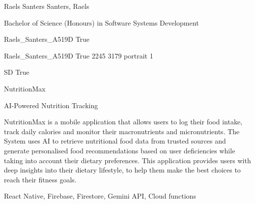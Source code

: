 \documentclass[twoside]{report}
\begin{document}
\begingroup{}\relax



\def\Key{Raels_Santers_A519D}

{Raels Santers}
{Santers, Raels}

{Bachelor of Science (Honours) in Software Systems Development}

{Raels_Santers_A519D}
{True}

{Raels_Santers_A519D}
{True}
{2245}
{3179}
{portrait}
{1}

{SD}
{True}

{NutritionMax}

{AI-Powered Nutrition Tracking}

{NutritionMax is a mobile application that allows users to log their food intake, track daily calories and monitor their macronutrients and micronutrients. The System uses AI to retrieve nutritional food data from trusted sources and generate personalised food recommendations based on user deficiencies while taking into account their dietary preferences. This application provides users with deep insights into their dietary lifestyle, to help them make the best choices to reach their fitness goals.}

{React Native, Firebase, Firestore, Gemini API, Cloud functions}
\end{document}
